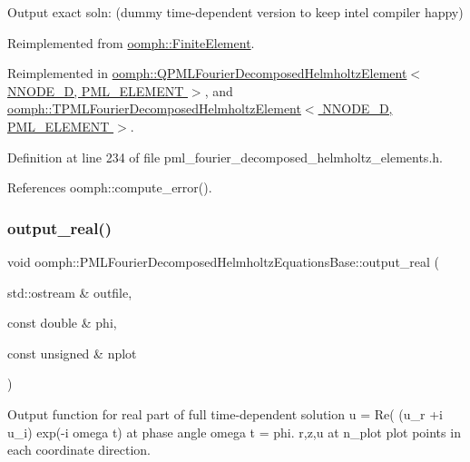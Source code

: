 Output exact soln\+: (dummy time-\/dependent version to keep intel compiler happy) 



Reimplemented from \hyperlink{classoomph_1_1FiniteElement_a2a8426dccd57b927be0ae0eec00d0479}{oomph\+::\+Finite\+Element}.



Reimplemented in \hyperlink{classoomph_1_1QPMLFourierDecomposedHelmholtzElement_a7fa77af72f24908212f80b3fa1519441}{oomph\+::\+Q\+P\+M\+L\+Fourier\+Decomposed\+Helmholtz\+Element$<$ N\+N\+O\+D\+E\+\_\+D, P\+M\+L\+\_\+\+E\+L\+E\+M\+E\+N\+T $>$}, and \hyperlink{classoomph_1_1TPMLFourierDecomposedHelmholtzElement_a72f800e47f97fbbf21bf108e0fa5e39b}{oomph\+::\+T\+P\+M\+L\+Fourier\+Decomposed\+Helmholtz\+Element$<$ N\+N\+O\+D\+E\+\_\+D, P\+M\+L\+\_\+\+E\+L\+E\+M\+E\+N\+T $>$}.



Definition at line 234 of file pml\+\_\+fourier\+\_\+decomposed\+\_\+helmholtz\+\_\+elements.\+h.



References oomph\+::compute\+\_\+error().

\mbox{\label{classoomph_1_1PMLFourierDecomposedHelmholtzEquationsBase_a5f933a0dcde510e734d387fea9b65cc2}} 
\subsubsection{\texorpdfstring{output\+\_\+real()}{output\_real()}}
{\footnotesize\ttfamily void oomph\+::\+P\+M\+L\+Fourier\+Decomposed\+Helmholtz\+Equations\+Base\+::output\+\_\+real (\begin{DoxyParamCaption}\item[{std\+::ostream \&}]{outfile,  }\item[{const double \&}]{phi,  }\item[{const unsigned \&}]{nplot }\end{DoxyParamCaption})}



Output function for real part of full time-\/dependent solution u = Re( (u\+\_\+r +i u\+\_\+i) exp(-\/i omega t) at phase angle omega t = phi. r,z,u at n\+\_\+plot plot points in each coordinate direction. 

